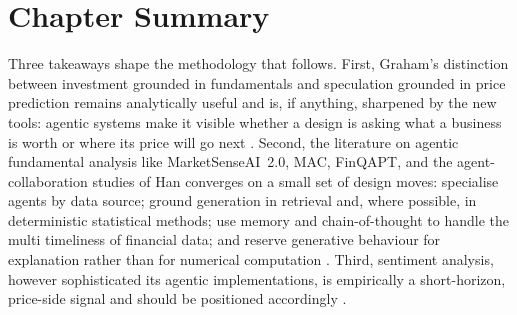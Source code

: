 \section{Chapter Summary}
\label{sec:summary}

Three takeaways shape the methodology that follows. First, Graham's
distinction between investment grounded in fundamentals and
speculation grounded in price prediction remains analytically useful
and is, if anything, sharpened by the new tools: agentic systems
make it visible whether a design is asking what a business is worth
or where its price will go next \citep{Graham2006}. Second, the
literature on agentic fundamental analysis like MarketSenseAI~2.0,
MAC, FinQAPT, and the agent-collaboration studies of Han \citep{han2024}
converges on a small set of design moves: specialise agents by data
source; ground generation in retrieval and, where possible, in
deterministic statistical methods; use memory and chain-of-thought
to handle the multi timeliness of financial data; and reserve
generative behaviour for explanation rather than for numerical
computation \citep{Fatouros2025MarketSense,han2024,saravanan2026,singh2024finqapt}.
Third, sentiment analysis, however sophisticated its agentic
implementations, is empirically a short-horizon, price-side signal
and should be positioned accordingly
\citep{bollen2011,Papasotiriou2024,xing2025had}.
